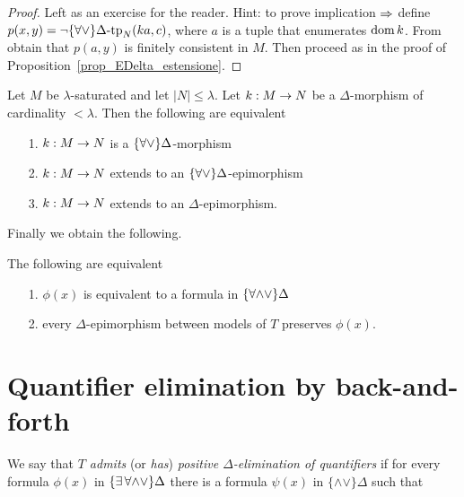 \begin{proof} Left as an exercise for the reader. Hint: to prove implication $\Rightarrow$ define $p(x,y)=\neg\{\forall\vee\}\Delta\mbox{\rm -tp}_N (ka,c)$, where $a$ is a tuple that enumerates $\mathop{\rm dom} k$. From  obtain that $p(a,y)$ is finitely consistent in $M$. Then proceed as in the proof of Proposition~\ref{prop_EDelta_estensione}.
\end{proof}

\begin{corollary}\label{corol_ADelta_estensione}
Let $M$ be $\lambda$-saturated and let $|N|\le\lambda$. Let $k:M\rightarrow N$ be a $\Delta$-morphism of cardinality $<\lambda$. Then the following are equivalent
\begin{itemize}
\item[1.] $k:M\rightarrow N$ is a $\{\forall\vee\}\Delta$-morphism
\item[2.] $k:M\rightarrow N$ extends to an $\{\forall\vee\}\Delta$-epimorphism
\item[3.] $k:M\rightarrow N$ extends to an $\Delta$-epimorphism.\QED
\end{itemize}
\end{corollary}

Finally we obtain the following.

\begin{theorem}
The following are equivalent
\begin{itemize}
\item[1.] $\phi(x)$ is equivalent to a formula in $\{\forall{\wedge}{\vee}\}\Delta$
\item[2.] every $\Delta$-epimorphism between models of $T$ preserves $\phi(x)$.\QED
\end{itemize}
\end{theorem}


\section{Quantifier elimination by back-and-forth}
\label{eliminazionequantificatoricriterio}

We say that \emph{$T$ admits\/} (or \emph{has\/}) \emph{positive $\Delta$-elimination of quantifiers\/} if for every formula $\phi(x)$ in $\{\exists\,\forall\mathord\wedge\mathord\vee\}\Delta$ there is a formula $\psi(x)$ in $\{\mathord\wedge\mathord\vee\}\Delta$ such that

